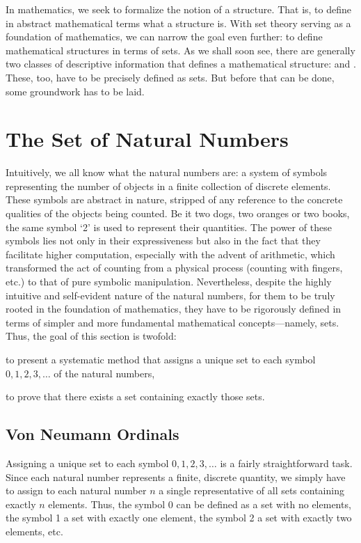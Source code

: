 \vspace{0.3cm}
\noindent
In mathematics, we seek to formalize the notion of a structure. That is, to define in abstract mathematical terms
what a structure is. With set theory serving as a foundation of mathematics, we can narrow the goal
even further: to define mathematical structures in terms of sets. As we shall soon see,
there are generally two classes of descriptive information that defines a mathematical structure:
 and . These, too, have to be precisely defined as sets.
But before that can be done, some groundwork has to be laid.

\section{The Set of Natural Numbers}
Intuitively, we all know what the natural numbers are: a system of symbols representing the number of
objects in a finite collection of discrete elements. These symbols are abstract in nature, stripped of
any reference to the concrete qualities of the objects being counted. Be it two dogs, two oranges or two books, the
same symbol `2' is used to represent their quantities.
The power of these symbols lies not only in their expressiveness but also in the fact that they facilitate higher
computation, especially with the advent of arithmetic, which transformed the act of counting from a physical process (counting with fingers, etc.) to that of pure
symbolic manipulation.
Nevertheless, despite the highly intuitive and self-evident nature of the natural numbers,
for them to be truly rooted in the foundation of mathematics, they have to be rigorously defined in terms of
simpler and more fundamental mathematical concepts---namely, sets. Thus, the goal of this section is twofold:
\begin{enumerate*} [label=(\roman*)]
    \item to present a systematic method that assigns a unique set to each symbol \( 0,1,2,3,\dots \) of the natural numbers,
    \item to prove that there exists a set containing exactly those sets.
\end{enumerate*}

\subsection{Von Neumann Ordinals} \label{ssec:von-neumann-ordinals}
Assigning a unique set to each symbol \( 0,1,2,3,\dots \) is a fairly straightforward task. Since each natural number represents
a finite, discrete quantity, we simply have to assign to each natural number \( n \) a single representative of all sets containing
exactly \( n \) elements. Thus, the symbol 0 can be defined as a set with no elements, the symbol 1 a set with
exactly one element, the symbol 2 a set with exactly two elements, etc.

